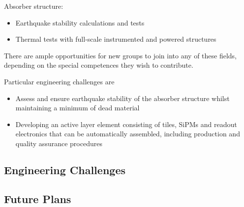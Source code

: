 Absorber structure:
\begin{itemize}
\item Earthquake stability calculations and tests
\item Thermal tests with full-scale instrumented and powered structures
\end{itemize}

There are ample opportunities for new groups to join into any of these fields, depending on the special competences they wish to contribute.

Particular engineering challenges are
\begin{itemize}
\item Assess and ensure earthquake stability of the absorber structure whilst maintaining a minimum of dead material
\item Developing an active layer element consisting of tiles, SiPMs and readout electronics that can be automatically assembled, including production and quality assurance procedures
\end{itemize}

\subsection{Engineering Challenges}
\subsection{Future Plans}
